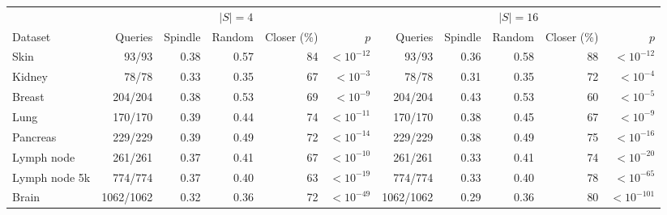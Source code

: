 \begin{tabular}{lrrrrrrrrrr}
\toprule
 & \multicolumn{5}{c}{$|S| = 4$} & \multicolumn{5}{c}{$|S| = 16$} \\
\cmidrule(lr){2-6} \cmidrule(lr){7-11}
Dataset & Queries & Spindle & Random & Closer (\%) & $p$ & Queries & Spindle & Random & Closer (\%) & $p$ \\
\midrule
Skin & 93/93 & 0.38 & 0.57 & 84 & $<10^{-12}$ & 93/93 & 0.36 & 0.58 & 88 & $<10^{-12}$ \\
Kidney & 78/78 & 0.33 & 0.35 & 67 & $<10^{-3}$ & 78/78 & 0.31 & 0.35 & 72 & $<10^{-4}$ \\
Breast & 204/204 & 0.38 & 0.53 & 69 & $<10^{-9}$ & 204/204 & 0.43 & 0.53 & 60 & $<10^{-5}$ \\
Lung & 170/170 & 0.39 & 0.44 & 74 & $<10^{-11}$ & 170/170 & 0.38 & 0.45 & 67 & $<10^{-9}$ \\
Pancreas & 229/229 & 0.39 & 0.49 & 72 & $<10^{-14}$ & 229/229 & 0.38 & 0.49 & 75 & $<10^{-16}$ \\
Lymph node & 261/261 & 0.37 & 0.41 & 67 & $<10^{-10}$ & 261/261 & 0.33 & 0.41 & 74 & $<10^{-20}$ \\
Lymph node 5k & 774/774 & 0.37 & 0.40 & 63 & $<10^{-19}$ & 774/774 & 0.33 & 0.40 & 78 & $<10^{-65}$ \\
Brain & 1062/1062 & 0.32 & 0.36 & 72 & $<10^{-49}$ & 1062/1062 & 0.29 & 0.36 & 80 & $<10^{-101}$ \\
\bottomrule
\end{tabular}
